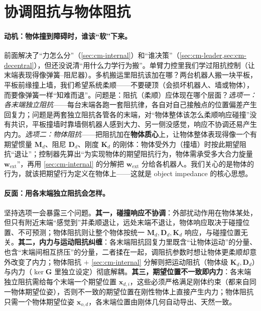 \section{协调阻抗与物体阻抗}
\label{sec:cm-impedance}

\paragraph{动机：物体撞到障碍时，谁该“软”下来。}
前面解决了“力怎么分”（\cref{sec:cm-internal}）和“谁决策”（\cref{sec:cm-leader,sec:cm-decentral}），但还没说清“用什么力学行为搬”。单臂力控里我们学过阻抗控制（让末端表现得像弹簧–阻尼器）。多机搬运里阻抗该加在哪？两台机器人搬一块平板，平板前缘撞上墙，我们希望系统柔顺——不要硬顶（会损坏机器人、墙或物体），而要像弹簧一样“知难而退”。问题是：阻抗（柔顺）应体现在哪个层面？\emph{选项一：各末端独立阻抗}——每台末端各跑一套阻抗律，各自对自己接触点的位置偏差产生回复力；问题是两套独立阻抗各管各的末端，对“物体整体该怎么柔顺响应碰撞”没有共识，平板撞墙时靠墙侧机器人感到大力、另一侧没感觉，响应不协调还易产生内力。\emph{选项二：物体阻抗}——把阻抗加在\textbf{物体质心}上，让物体整体表现得像一个有期望惯量 $\mathbf{M}_d$、阻尼 $\mathbf{D}_d$、刚度 $\mathbf{K}_d$ 的刚体：物体受外力（撞墙）时按此期望阻抗“退让”；控制器先算出“为实现物体的期望阻抗行为，物体需承受多大合力旋量 $\mathbf{w}_{\text{ext}}$”，再用 \cref{sec:cm-internal} 的分解把 $\mathbf{w}_{\text{ext}}$ 分给各机器人。我们关心的是物体的行为，就该把期望行为定义在物体上——这就是 object impedance 的核心思想。

\paragraph{反面：用各末端独立阻抗会怎样。}
坚持选项一会暴露三个问题。\textbf{其一，碰撞响应不协调}：外部扰动作用在物体某处，但只有附近末端“感觉到”并柔顺退让，远处末端不退让，物体响应取决于碰撞位置、不可预测；物体阻抗则让整个物体按统一 $\mathbf{M}_d,\mathbf{D}_d,\mathbf{K}_d$ 响应，与碰撞位置无关。\textbf{其二，内力与运动阻抗纠缠}：各末端阻抗回复力里既含“让物体运动”的分量、也含“末端间相互挤压”的分量，二者揉在一起，调阻抗参数时想让物体更柔顺却意外改变了内力；物体阻抗 $+$ \cref{sec:cm-internal} 分解则把运动阻抗（物体级 $\mathbf{K}_d,\mathbf{D}_d$）与内力（$\ker\mathbf{G}$ 里独立设定）彻底解耦。\textbf{其三，期望位置不一致即内力}：各末端独立阻抗需给每个末端一个期望位置 $\mathbf{x}_{d,i}$，这些必须严格满足刚体约束（都来自同一物体期望位姿），否则不一致的期望位置在刚性物体上直接产生内力；物体阻抗只需一个物体期望位姿 $\mathbf{x}_{o,d}$，各末端位置由刚体几何自动导出、天然一致。

